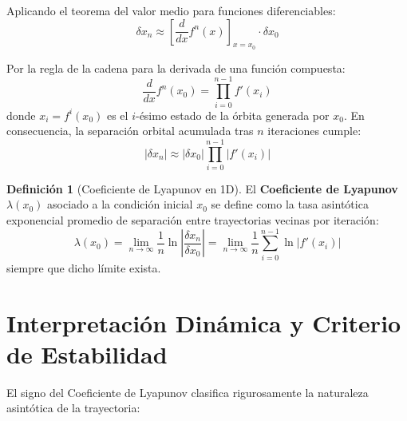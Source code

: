\documentclass[11pt,letterpaper]{article}
\theoremstyle{definition}
\newtheorem{definicion}{Definición}[section]
\begin{document}
Aplicando el teorema del valor medio para funciones diferenciables:
\begin{equation}
    \delta x_n \approx \left[ \frac{d}{dx} f^n(x) \right]_{x=x_0} \cdot \delta x_0
\end{equation}

Por la regla de la cadena para la derivada de una función compuesta:
\begin{equation}
    \frac{d}{dx} f^n(x_0) = \prod_{i=0}^{n-1} f'(x_i)
\end{equation}
donde $x_i = f^i(x_0)$ es el $i$-ésimo estado de la órbita generada por $x_0$. En consecuencia, la separación orbital acumulada tras $n$ iteraciones cumple:
\begin{equation}
    |\delta x_n| \approx |\delta x_0| \prod_{i=0}^{n-1} |f'(x_i)|
\end{equation}

\begin{definicion}[Coeficiente de Lyapunov en 1D]
El \textbf{Coeficiente de Lyapunov} $\lambda(x_0)$ asociado a la condición inicial $x_0$ se define como la tasa asintótica exponencial promedio de separación entre trayectorias vecinas por iteración:
\begin{equation}
    \lambda(x_0) = \lim_{n \to \infty} \frac{1}{n} \ln \left| \frac{\delta x_n}{\delta x_0} \right| = \lim_{n \to \infty} \frac{1}{n} \sum_{i=0}^{n-1} \ln |f'(x_i)|
    \label{eq:lyapunov_def_formal}
\end{equation}
siempre que dicho límite exista.
\end{definicion}

\section{Interpretación Dinámica y Criterio de Estabilidad}

El signo del Coeficiente de Lyapunov clasifica rigurosamente la naturaleza asintótica de la trayectoria:
\end{document}
